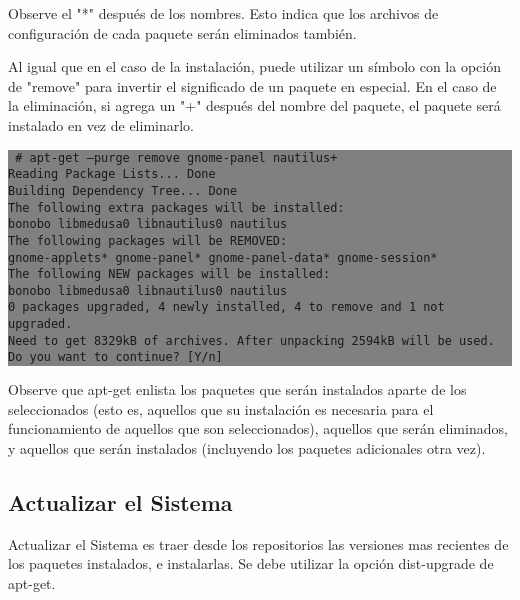 \documentclass[12pt]{article}
\begin{document}
Observe el "*" después de los nombres. Esto indica que los archivos de configuración de cada paquete serán eliminados también.

Al igual que en el caso de la instalación, puede utilizar un símbolo con la opción de "remove" para invertir el significado de un paquete en especial. En el caso de la eliminación, si agrega un "+" después del nombre del paquete, el paquete será instalado en vez de eliminarlo.

\colorbox{grey}{\parbox[t]{0.95\linewidth}{ \vspace*{0.5cm} {\tt
     \# apt-get --purge remove gnome-panel nautilus+\\
     Reading Package Lists... Done\\
     Building Dependency Tree... Done\\
     The following extra packages will be installed:\\
       bonobo libmedusa0 libnautilus0 nautilus\\
     The following packages will be REMOVED:\\
       gnome-applets* gnome-panel* gnome-panel-data* gnome-session*\\
     The following NEW packages will be installed:\\
       bonobo libmedusa0 libnautilus0 nautilus\\
     0 packages upgraded, 4 newly installed, 4 to remove and 1 not upgraded.\\
     Need to get 8329kB of archives. After unpacking 2594kB will be used.\\
     Do you want to continue? [Y/n]\\
 } \vspace*{0.5cm} } } 

Observe que apt-get enlista los paquetes que serán instalados aparte de los seleccionados (esto es, aquellos que su instalación es necesaria para el funcionamiento de aquellos que son seleccionados), aquellos que serán eliminados, y aquellos que serán instalados (incluyendo los paquetes adicionales otra vez).

\subsection*{Actualizar el Sistema}

Actualizar el Sistema es traer desde los repositorios las versiones mas recientes de los paquetes instalados,
e instalarlas. Se debe utilizar la opción dist-upgrade de apt-get.
\end{document}
